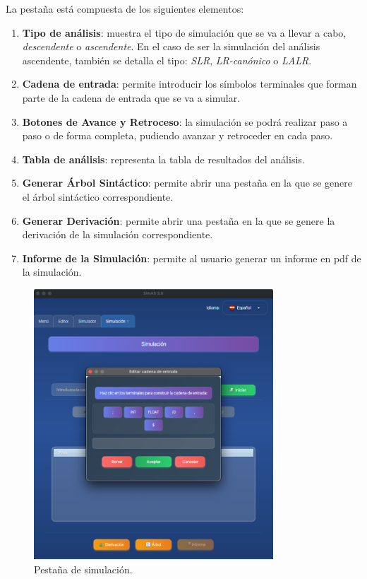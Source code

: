 La pestaña está compuesta de los siguientes elementos:
\begin{enumerate}
  \item \textbf{Tipo de análisis}: muestra el tipo de simulación que se va a llevar a cabo, \textit{descendente} o \textit{ascendente}. En el caso de ser la simulación del análisis ascendente, también se detalla el tipo: \textit{SLR}, \textit{LR-canónico} o \textit{LALR}.
 \item \textbf{Cadena de entrada}: permite introducir los símbolos terminales que forman parte de la cadena de entrada que se va a simular.
 \item \textbf{Botones de Avance y Retroceso}: la simulación se podrá realizar paso a paso o de forma completa, pudiendo avanzar y retroceder en cada paso.
 \item \textbf{Tabla de análisis}: representa la tabla de resultados del análisis.
 \item \textbf{Generar Árbol Sintáctico}: permite abrir una pestaña en la que se genere el árbol sintáctico correspondiente.
 \item \textbf{Generar Derivación}: permite abrir una pestaña en la que se genere la derivación de la simulación correspondiente.
 \item \textbf{Informe de la Simulación}: permite al usuario generar un informe en pdf de la simulación.
\end{enumerate}

\begin{figure}[htp]
\centering
	\includegraphics[width=0.8\textwidth]{figuras2/simulador/simulacion_cadenaEntrada.png}
	\caption{Pestaña de simulación.}
	\label{fig:d7}
\end{figure}

